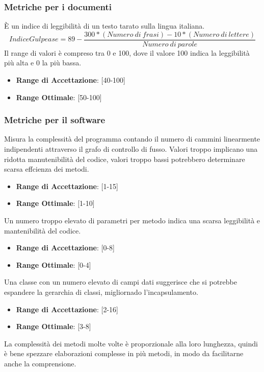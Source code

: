 \documentclass[12pt,a4paper]{article}
\begin{document}
\subsubsection{Metriche per i documenti}
È un indice di leggibilità di un testo tarato sulla lingua italiana.
\[IndiceGulpease=89-\frac{300*(Numero\ di\ frasi)-10*(Numero\ di\ lettere)}{Numero\ di\ parole}\]
Il range di valori è compreso tra 0 e 100, dove il valore 100 indica la leggibilità più alta e 0 la più bassa.
\begin{itemize}
\item \textbf{Range di Accettazione}: [40-100]
\item \textbf{Range Ottimale}: [50-100]
\end{itemize}
\subsubsection{ Metriche per il software}
Misura la complessità del programma contando il numero di cammini linearmente indipendenti attraverso il grafo di controllo di fusso. Valori troppo implicano una ridotta manutenibilità del codice, valori troppo bassi potrebbero determinare scarsa effcienza dei metodi.
\begin{itemize}
\item \textbf{Range di Accettazione}: [1-15]
\item \textbf{Range Ottimale}: [1-10]
\end{itemize}
Un numero troppo elevato di parametri per metodo indica una scarsa leggibilità e mantenibilità del codice.
\begin{itemize}
\item \textbf{Range di Accettazione}: [0-8]
\item \textbf{Range Ottimale}: [0-4]
\end{itemize}
Una classe con un numero elevato di campi dati suggerisce che si potrebbe espandere la gerarchia di classi, migliornado l'incapsulamento.
\begin{itemize}
\item \textbf{Range di Accettazione}: [2-16]
\item \textbf{Range Ottimale}: [3-8]
\end{itemize}
La complessità dei metodi molte volte è proporzionale alla loro lunghezza,
quindi è bene spezzare elaborazioni complesse in più metodi, in modo da facilitarne anche la comprensione.
\end{document}
